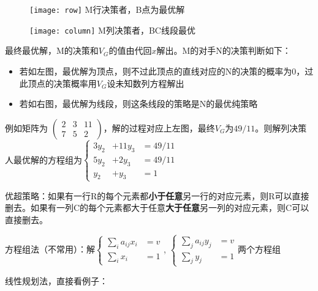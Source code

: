 \documentclass[UTF8, 6pt]{ctexart}
\newcommand{\mcompress}{\vspace{-10 px}}
\begin{document}
\mcompress

\begin{figure}[h]
\centering
\begin{minipage}{0.3\linewidth}
	\texttt{[image: row]}
	{\scriptsize M行决策者，B点为最优解}
\end{minipage}
\hspace{0.1\linewidth}
\begin{minipage}{0.3\linewidth}
	\texttt{[image: column]}
	{\scriptsize M列决策者，BC线段最优}
\end{minipage}
\end{figure}

\mcompress
最终最优解，M的决策和$V_G$的值由代回$x$解出。M的对手N的决策判断如下：

\begin{itemize}
	\item 若如左图，最优解为顶点，则不过此顶点的直线对应的N的决策的概率为0，过此顶点的决策概率用$V_G$设未知数列方程解出
	\item 若如右图，最优解为线段，则这条线段的策略是N的最优纯策略
\end{itemize}

例如矩阵为 $
\left(
\begin{array}{ccc}
2&3&11\\
7&5&2
\end{array}
\right)
$，解的过程对应上左图，最终$V_G$为$49/11$。则解列决策人最优解的方程组为$
\left\lbrace 
\begin{array}{rll}
	3y_2 & +11y_3 & =49/11  \\
	5y_2 & + 2y_3 & = 49/11 \\
	y_2  &  +y_3  &   = 1
\end{array}
\right.
$

优超策略：如果有一行R的每个元素都\textbf{小于任意}另一行的对应元素，则R可以直接删去。如果有一列C的每个元素都大于任意\textbf{大于任意}另一列的对应元素，则C可以直接删去。

方程组法（不常用）：解$
\left\lbrace
\begin{array}{rc}
\sum_i a_{ij}x_i &= v\\
\sum_i x_i &= 1
\end{array}
\right.
$, $\left\lbrace
\begin{array}{rc}
\sum_j a_{ij}y_j &= v\\
\sum_j y_j &= 1
\end{array}
\right.$两个方程组

线性规划法，直接看例子：
\end{document}
